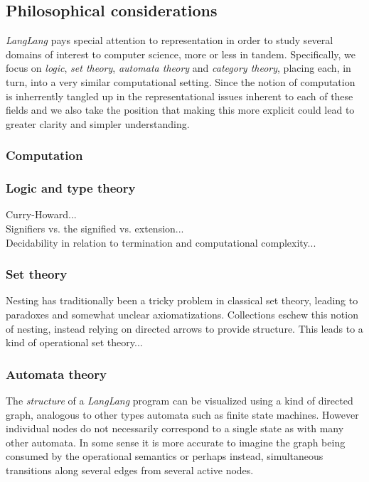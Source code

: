 \documentclass[a4paper,11pt]{article}
\begin{document}
\subsection{Philosophical considerations}

\textsl{LangLang} pays special attention to representation in order to study several domains of interest to computer science, more or less in tandem.
Specifically, we focus on \emph{logic}, \emph{set theory}, \emph{automata theory} and \emph{category theory}, placing each, in turn, into a very similar computational setting.
Since the notion of computation is inherrently tangled up in the representational issues inherent to each of these fields and we also take the position that making this more explicit could lead to greater clarity and simpler understanding.

\subsubsection{Computation}


\subsubsection{Logic and type theory}

{\color{gray}
Curry-Howard...\\
Signifiers vs. the signified vs. extension...\\
Decidability in relation to termination and computational complexity...
}

\subsubsection{Set theory}

Nesting has traditionally been a tricky problem in classical set theory, leading to paradoxes and somewhat unclear axiomatizations.
Collections eschew this notion of nesting, instead relying on directed arrows to provide structure.
{\color{gray}
This leads to a kind of operational set theory...
}

\subsubsection{Automata theory}

The \emph{structure} of a \textsl{LangLang} program can be visualized using a kind of directed graph, analogous to other types automata such as finite state machines.
However individual nodes do not necessarily correspond to a single state as with many other automata.
In some sense it is more accurate to imagine the graph being consumed by the operational semantics or perhaps instead, simultaneous transitions along several edges from several active nodes.
\end{document}
